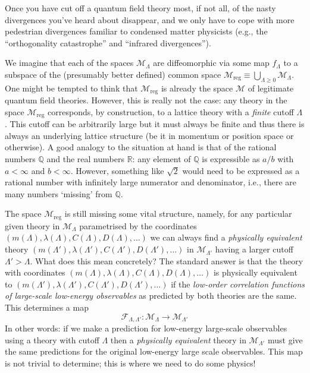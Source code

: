 \documentclass[11pt]{amsart}
\theoremstyle{plain}%
\theoremstyle{definition}
\theoremstyle{remark}
\begin{document}
Once you have cut off a quantum field theory most, if not all, of the nasty divergences you've heard about disappear, and we only have to cope with more pedestrian divergences familiar to condensed matter physicists (e.g., the ``orthogonality catastrophe'' and ``infrared divergences''). 

We imagine that each of the spaces $\mathcal{M}_\Lambda$ are diffeomorphic via some map $f_\Lambda$ to a subspace of the (presumably better defined) common space $\mathcal{M}_{\text{reg}} \equiv \bigcup_{\Lambda \ge 0} \mathcal{M}_{\Lambda}$. One might be tempted to think that $\mathcal{M}_{\text{reg}}$ is already the space $\mathcal{M}$ of legitimate quantum field theories. However, this is really not the case: any theory in the space $\mathcal{M}_{\text{reg}}$ corresponds, by construction, to a lattice theory with a \emph{finite} cutoff $\Lambda$. This cutoff can be arbitrarily large but it must always be finite and thus there is always an underlying lattice structure (be it in momentum or position space or otherwise). A good analogy to the situation at hand is that of the rational numbers $\mathbb{Q}$ and the real numbers $\mathbb{R}$: any element of $\mathbb{Q}$ is expressible as $a/b$ with $a<\infty$ and $b < \infty$. However, something like $\sqrt{2}$ would need to be expressed as a rational number with infinitely large numerator and denominator, i.e., there are many numbers `missing' from $\mathbb{Q}$. 

The space $\mathcal{M}_{\text{reg}}$ is still missing some vital structure, namely, for any particular given theory in $\mathcal{M}_{\Lambda}$ parametrised by the coordinates $(m(\Lambda), \lambda(\Lambda), C(\Lambda), D(\Lambda), \ldots)$ we can always find a \emph{physically equivalent} theory $(m(\Lambda'), \lambda(\Lambda'), C(\Lambda'), D(\Lambda'), \ldots)$ in $\mathcal{M}_{\Lambda'}$ having a larger cutoff $\Lambda' > \Lambda$. What does this mean concretely? The standard answer is that the theory with coordinates $(m(\Lambda), \lambda(\Lambda), C(\Lambda), D(\Lambda), \ldots)$ is physically equivalent to $(m(\Lambda'), \lambda(\Lambda'), C(\Lambda'), D(\Lambda'), \ldots)$ if the \emph{low-order correlation functions of large-scale low-energy observables} as predicted by both theories are the same. This determines a map
\begin{equation}
	\mathcal{F}_{\Lambda,\Lambda'}: \mathcal{M}_\Lambda \rightarrow \mathcal{M}_{\Lambda'}
\end{equation}
In other words: if we make a prediction for low-energy large-scale observables using a theory with cutoff $\Lambda$ then a \emph{physically equivalent} theory in $\mathcal{M}_{\Lambda'}$ must give the same predictions for the original low-energy large scale observables. This map is not trivial to determine; this is where we need to do some physics! 
\end{document}
